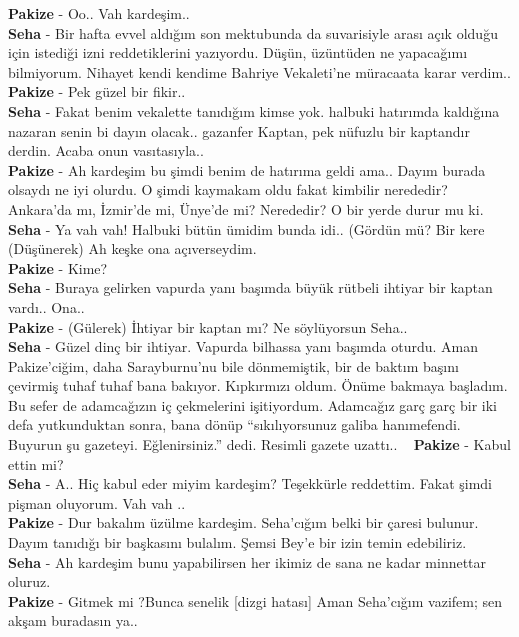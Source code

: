 \documentclass[]{book}
\begin{document}
\textbf{Pakize} - Oo.. Vah kardeşim..\\
\textbf{Seha} - Bir hafta evvel aldığım son mektubunda da suvarisiyle arası açık olduğu için istediği izni reddetiklerini yazıyordu. Düşün, üzüntüden ne yapacağımı bilmiyorum. Nihayet kendi kendime Bahriye Vekaleti'ne müracaata karar verdim..\\
\textbf{Pakize} - Pek güzel bir fikir..\\
\textbf{Seha} - Fakat benim vekalette tanıdığım kimse yok. halbuki hatırımda kaldığına nazaran senin bi dayın olacak.. gazanfer Kaptan, pek nüfuzlu bir kaptandır derdin. Acaba onun vasıtasıyla..\\
\textbf{Pakize} - Ah kardeşim bu şimdi benim de hatırıma geldi ama.. Dayım burada olsaydı ne iyi olurdu. O şimdi kaymakam oldu fakat kimbilir nerededir? Ankara'da mı, İzmir'de mi, Ünye'de mi? Nerededir? O bir yerde durur mu ki.\\
\textbf{Seha} - Ya vah vah! Halbuki bütün ümidim bunda idi.. (Gördün mü? Bir kere (Düşünerek) Ah keşke ona açıverseydim.\\
\textbf{Pakize} - Kime?\\
\textbf{Seha} - Buraya gelirken vapurda yanı başımda büyük rütbeli ihtiyar bir kaptan vardı.. Ona..\\
\textbf{Pakize} - (Gülerek) İhtiyar bir kaptan mı? Ne söylüyorsun Seha..\\
\textbf{Seha} - Güzel dinç bir ihtiyar. Vapurda bilhassa yanı başımda oturdu. Aman Pakize'ciğim, daha Sarayburnu'nu bile dönmemiştik, bir de baktım başını çevirmiş tuhaf tuhaf bana bakıyor. Kıpkırmızı oldum. Önüme bakmaya başladım. Bu sefer de adamcağızın iç çekmelerini işitiyordum. Adamcağız garç garç bir iki defa yutkunduktan sonra, bana dönüp ``sıkılıyorsunuz galiba hanımefendi. Buyurun şu gazeteyi. Eğlenirsiniz.'' dedi. Resimli gazete uzattı.. ~
\textbf{Pakize} - Kabul ettin mi?\\
\textbf{Seha} - A.. Hiç kabul eder miyim kardeşim? Teşekkürle reddettim. Fakat şimdi pişman oluyorum. Vah vah ..\\
\textbf{Pakize} - Dur bakalım üzülme kardeşim. Seha'cığım belki bir çaresi bulunur. Dayım tanıdığı bir başkasını bulalım. Şemsi Bey'e bir izin temin edebiliriz.\\
\textbf{Seha} - Ah kardeşim bunu yapabilirsen her ikimiz de sana ne kadar minnettar oluruz.\\
\textbf{Pakize} - Gitmek mi ?Bunca senelik {[}dizgi hatası{]} Aman Seha'cığım vazifem; sen akşam buradasın ya..\\
\end{document}
